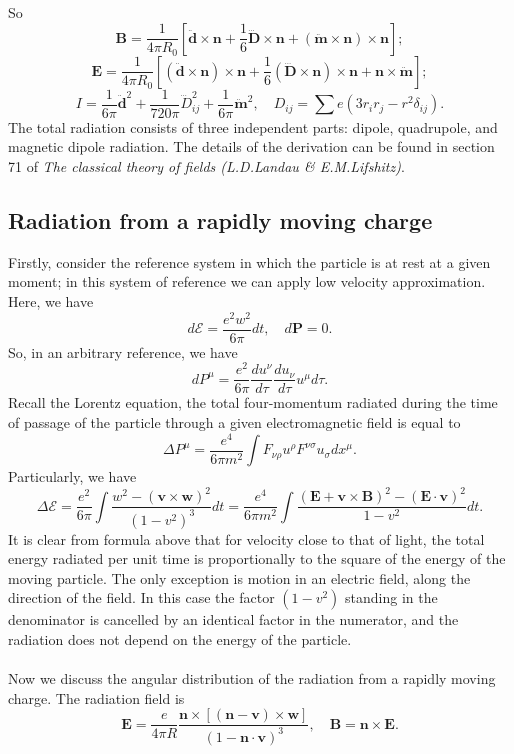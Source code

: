 So
\[\bm{B} = \frac{1}{4\pi R_0} \left[ \ddot{\bm{d}} \times \bm{n} + \frac{1}{6}\dddot{\bm{D}}\times\bm{n} + (\ddot{\bm{m}}\times\bm{n})\times\bm{n}\right];\]
\[\bm{E} = \frac{1}{4\pi R_0} \left[ (\ddot{\bm{d}} \times \bm{n})\times \bm{n} + \frac{1}{6}(\dddot{\bm{D}}\times\bm{n})\times \bm{n} + \bm{n} \times \ddot{\bm{m}}\right];\]
\[I = \frac{1}{6\pi}\ddot{\bm{d}}^2 + \frac{1}{720\pi} \dddot{D}_{ij}^2 + \frac{1}{6\pi} \ddot{\bm{m}}^2 , \quad D_{ij} = \sum e(3r_{i}r_{j}-r^2\delta_{ij}).\]
The total radiation consists of three independent parts:
dipole, quadrupole, and magnetic dipole radiation. The details of the derivation can be found in section 71 of \emph{The classical theory of fields (L.D.Landau \& E.M.Lifshitz)}.

\subsection{Radiation from a rapidly moving charge}
Firstly, consider the reference system in which the particle is at rest at a given moment; in this system of reference we can apply low velocity approximation. Here, we have
\[d\mathcal{E} = \frac{e^2 w^2}{6\pi}dt , \quad d\bm{P} = 0.\]
So, in an arbitrary reference, we have
\[dP^{\mu} = \frac{e^2}{6\pi} \frac{du^{\nu}}{d\tau} \frac{du_{\nu}}{d\tau} u^{\mu}d\tau.\]
Recall the Lorentz equation, the total four-momentum radiated during the time of passage of the particle through a given electromagnetic field is equal to
\[\Delta P^{\mu} = \frac{e^4}{6\pi m^2} \int F_{\nu\rho}u^{\rho} F^{\nu\sigma}u_{\sigma} dx^{\mu}.\]
Particularly, we have
\[\Delta \mathcal{E} = \frac{e^2}{6\pi} \int \frac{w^2 - (\bm{v} \times \bm{w})^2}{(1-v^2)^3} dt = \frac{e^4}{6\pi m^2} \int \frac{(\bm{E} + \bm{v} \times \bm{B})^2-(\bm{E} \cdot \bm{v})^2}{1-v^2} dt.\]
It is clear from formula above that for velocity close to that of light, the total energy radiated per unit time is proportionally to the square of the energy of the moving particle. The only exception is motion in an electric field, along the direction of the field. In this case the factor $(1-v^2)$ standing in the denominator is cancelled by an identical factor in the numerator, and the radiation does not depend on the energy of the particle.
\\ \\
Now we discuss the angular distribution of the radiation from a rapidly moving charge. The radiation field is
\[\bm{E} = \frac{e}{4\pi R} \frac{\bm{n} \times \left[(\bm{n} - \bm{v}) \times \bm{w} \right]}{(1 - \bm{n} \cdot \bm{v})^3}  , \quad \bm{B} = \bm{n} \times \bm{E}.\]
